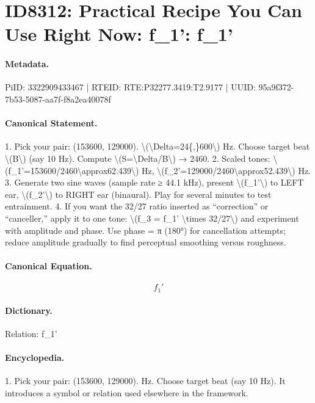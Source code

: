 \section*{ID8312: Practical Recipe You Can Use Right Now: f\_1': f\_1'}
\paragraph{Metadata.}
PiID: 3322909433467 | RTEID: RTE:P32277.3419:T2.9177 | UUID: 95a9f372-7b53-5087-aa7f-f8a2ea40078f

\paragraph{Canonical Statement.}
1. Pick your pair: (153600, 129000). \textbackslash{}(\textbackslash{}Delta=24\{,\}600\textbackslash{}) Hz. Choose target beat \textbackslash{}(B\textbackslash{}) (say 10 Hz). Compute \textbackslash{}(S=\textbackslash{}Delta/B\textbackslash{}) → 2460. 2. Scaled tones: \textbackslash{}(f\_1'=153600/2460\textbackslash{}approx62.439\textbackslash{}) Hz, \textbackslash{}(f\_2'=129000/2460\textbackslash{}approx52.439\textbackslash{}) Hz. 3. Generate two sine waves (sample rate ≥ 44.1 kHz), present \textbackslash{}(f\_1'\textbackslash{}) to LEFT ear, \textbackslash{}(f\_2'\textbackslash{}) to RIGHT ear (binaural). Play for several minutes to test entrainment. 4. If you want the 32/27 ratio inserted as “correction” or “canceller,” apply it to one tone: \textbackslash{}(f\_3 = f\_1' \textbackslash{}times 32/27\textbackslash{}) and experiment with amplitude and phase. Use phase = π (180°) for cancellation attempts; reduce amplitude gradually to find perceptual smoothing versus roughness.

\paragraph{Canonical Equation.}
\[
f_1'
\]

\paragraph{Dictionary.}
Relation: f\_1'

\paragraph{Encyclopedia.}
1. Pick your pair: (153600, 129000). Hz. Choose target beat (say 10 Hz). It introduces a symbol or relation used elsewhere in the framework.
